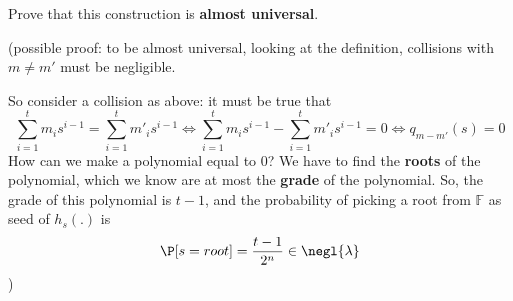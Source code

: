 \begin{exercise}
    Prove that this construction is \textbf{almost universal}.

    (possible proof: to be almost universal, looking at the definition, collisions with $m \not= m'$ must be negligible.

    So consider a collision as above: it must be true that  
    \[
        \sum_{i=1}^{t} m_{i}s^{i-1}=\sum_{i=1}^{t} m'_{i}s^{i-1} \Leftrightarrow 
        \sum_{i=1}^{t} m_{i}s^{i-1}-\sum_{i=1}^{t} m'_{i}s^{i-1}=0 \Leftrightarrow
        q_{m-m'}(s)=0
    \]
    How can we make a polynomial equal to 0? We have to find the \textbf{roots} of the polynomial, which we know are at most the \textbf{grade} of the polynomial. So, the grade of this polynomial is $t-1$, and the probability of picking a root from $ \mathbb{F} $ as seed of $h_{s}(.)$ is 
    \[
        \P [s=root]=\frac{t-1}{2^{n}}   \in \negl{\lambda} 
    \] )
\end{exercise}
 